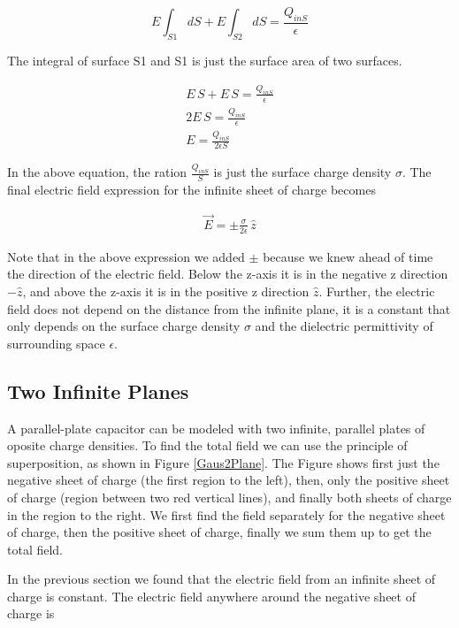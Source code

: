 \documentclass{ximera}
\begin{document}
 

\begin{equation}
E \int_{S1} dS + E \int_{S2} dS = \frac{Q_{inS}}{\epsilon}
\end{equation}

 The integral of surface S1 and S1 is just the surface area of two surfaces.
 
\begin{eqnarray}
E \, S + E \, S = \frac{Q_{inS}}{\epsilon} \\
 2 E \,S = \frac{Q_{inS}}{\epsilon} \\
 E=\frac{Q_{inS}}{2 \epsilon S}
\end{eqnarray}

In the above equation, the ration $\frac{Q_{inS}}{S}$ is just the surface charge density $\sigma$. The final electric field expression for the infinite sheet of charge becomes

\begin{eqnarray}
 \vec{E}  = \pm \frac{\sigma}{2 \epsilon } \, \hat{z}
\end{eqnarray}

Note that in the above expression we added $\pm$ because we knew ahead of time the direction of the electric field. Below the z-axis it is in the negative z direction $-\hat{z}$, and above the z-axis it is in the positive z direction $\hat{z}$. Further, the electric field does not depend on the distance from the infinite plane, it is a constant that only depends on the surface charge density $\sigma$ and the dielectric permittivity of surrounding space $\epsilon$.

\subsection{Two Infinite Planes}


A parallel-plate capacitor can be modeled with two infinite, parallel plates of oposite charge densities. To find the total field we can use the principle of superposition, as shown in Figure \ref{Gaus2Plane}. The Figure shows first just the negative sheet of charge (the first region to the left), then, only the positive sheet of charge (region between two red vertical lines), and finally both sheets of charge in the region to the right. We first find the field separately for  the negative sheet of charge, then the positive sheet of charge, finally we sum them up to get the total field. 

In the previous section we found that the electric field from an infinite sheet of charge is constant. The electric field anywhere around the negative sheet of charge is
\end{document}
